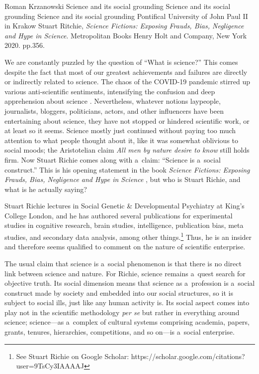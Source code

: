 \begin{newrevengenv}{Roman Krzanowski}
	{Science and its social grounding}
	{Science and its social grounding}
	{Science and its social grounding}
	{Pontifical University of John Paul II in Krakow}
	{Stuart Ritchie, \textit{Science Fictions: Exposing Frauds, Bias, Negligence and Hype in Science}. Metropolitan Books Henry Holt and Company, New York 2020. pp.356.}





\lettrine[loversize=0.13,lines=2,lraise=-0.01,nindent=0em,findent=0.2pt]%
{W}{}e are constantly puzzled by the question of ``What is science?'' This comes despite the fact that most of our greatest achievements and failures are directly or indirectly related to science. The chaos of the COVID-19 pandemic stirred up various anti-scientific sentiments, intensifying the confusion and deep apprehension about science
\parencite[see e.g.][]{blaylock_covid_2022}. %
 Nevertheless, whatever notions laypeople, journalists, bloggers, politicians, actors, and other influencers have been entertaining about science, they have not stopped or hindered scientific work, or at least so it seems. Science mostly just continued without paying too much attention to what people thought about it, like it was somewhat oblivious to social moods; the Aristotelian claim \textit{All men by nature desire to know} still holds firm. Now Stuart Richie comes along with a~claim: ``Science is a~social construct.'' This is his opening statement in the book \textit{Science Fictions: Exposing Frauds, Bias, Negligence and Hype in Science} 
\parencite*[][]{ritchie_science_2020}, %
 but who is Stuart Richie, and what is he actually saying?

Stuart Richie lectures in Social Genetic \& Developmental Psychiatry at King's College London, and he has authored several publications for experimental studies in cognitive research, brain studies, intelligence, publication bias, meta studies, and secondary data analysis, among other things.\footnote{See Stuart Richie on Google Scholar: https://scholar.google.com/citations?user=9TsCy3IAAAAJ} Thus, he is an insider and therefore seems qualified to comment on the nature of scientific enterprise.

The usual claim that science is a~social phenomenon
\parencites*[see e.g.][]{bloor_knowledge_1976}[][]{bloor_knowledge_1991}[][]{mackenzie_notes_1981}[][]{longino_social_2002} %
 is that there is no direct link between science and nature. For Richie, science remains a~quest search for objective truth. Its social dimension means that science as a~profession is a~social construct made by society and embedded into our social structures, so it is subject to social ills, just like any human activity is. Its social aspect comes into play not in the scientific methodology \textit{per se} but rather in everything around science; science—as a~complex of cultural systems comprising academia, papers, grants, tenures, hierarchies, competitions, and so on—is a~social enterprise.


\end{newrevengenv}
